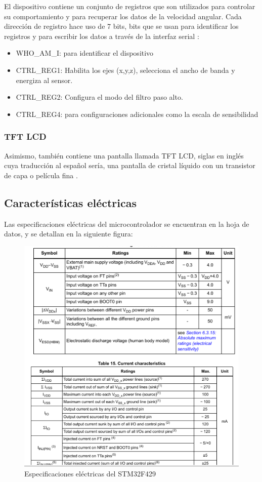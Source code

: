  El dispositivo contiene un conjunto de registros que son utilizados para controlar su comportamiento y para recuperar los datos de la velocidad angular. Cada dirección de registro hace uso de 7 bits, bits que se usan para identificar los registros y para escribir los datos a través de la interfaz serial \cite{sensor}:
 \begin{itemize}
     \item WHO\_AM\_I: para identificar el dispositivo
     \item CTRL\_REG1: Habilita los ejes (x,y,z), selecciona el ancho de banda y energiza al sensor.
     \item CTRL\_REG2: Configura el modo del filtro paso alto.
     \item CTRL\_REG4: para configuraciones adicionales como la escala de sensibilidad
 \end{itemize}

    \subsubsection{TFT LCD}

    Asimismo, también contiene una pantalla llamada TFT LCD, siglas en inglés cuya traducción al español sería, una pantalla de cristal líquido con un transistor de capa o película fina \cite{STM}. 
    
    \subsection{Características eléctricas}
    
    Las especificaciones eléctricas del microcontrolador se encuentran en la hoja de datos, y se detallan en la siguiente figura:
    \begin{figure}[H]
        \centering
        \includegraphics[width=0.5\linewidth]{fotos/caracteristicas electricas.png}
        \caption{Especificaciones eléctricas del STM32F429 \cite{STM3}}
        \label{electrica}
    \end{figure}

